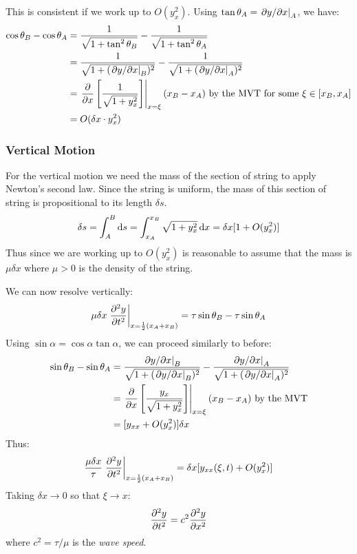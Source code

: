 \documentclass[../main.tex]{subfiles}
\begin{document}
This is consistent if we work up to $O(y^2_x)$.
Using $\tan \theta_A = \left. \partial y/\partial x \right|_{A}$, we have:
\begin{align*}
  \cos \theta_B - \cos \theta_A &= \frac{1}{\sqrt{1 + \tan^2 \theta_B}} - \frac{1}{\sqrt{1 + \tan^2 \theta_A}} \\
                                &= \frac{1}{\sqrt{1 + (\at{\partial y/\partial x}{B})^2}} - \frac{1}{\sqrt{1 + (\at{\partial y/\partial x}{A})^2}} \\
                                &= \at{\pderiv{}{x}\left[\frac{1}{\sqrt{1 + y^2_x}}\right]}{x = \xi} (x_B - x_A) \text{ by the MVT for some $\xi \in [x_B, x_A]$} \\
                                &= O(\delta x \cdot y^2_x)
\end{align*}

\subsubsection{Vertical Motion} \label{vertMot}
For the vertical motion we need the mass of the section of string to apply Newton's second law.
Since the string is uniform, the mass of this section of string is propositional to its length $\delta s$.
\begin{align*}
  \delta s = \int_{A}^{B} \d{s} = \int_{x_A}^{x_B} \sqrt{1 + y^2_x} \d{x} = \delta x[1 + O(y^2_x)]
\end{align*}
Thus since we are working up to $O(y^2_x)$ is reasonable to assume that the mass is $\mu \delta x$ where $\mu > 0$ is the density of the string.

We can now resolve vertically:
\[
  \mu \delta x \at{\pderiv[2]{y}{t}}{x = \frac{1}{2}(x_A + x_B)} = \tau \sin \theta_B - \tau \sin \theta_A
\]
Using $\sin \alpha = \cos \alpha \tan \alpha$, we can proceed similarly to before:
\begin{align*}
  \sin \theta_B - \sin \theta_A &= \frac{\at{\partial y/\partial x}{B}}{\sqrt{1 + (\at{\partial y/\partial x}{B})^2}} - \frac{\at{\partial y/\partial x}{A}}{\sqrt{1 + (\at{\partial y/\partial x}{A})^2}} \\
                                &= \at{\pderiv{}{x}\left[\frac{y_x}{\sqrt{1 + y^2_x}}\right]}{x = \xi} (x_B - x_A) \text{ by the MVT} \\
                                &= [y_{x x} + O(y^2_x)] \delta x
\end{align*}
Thus:
\[
  \frac{\mu \delta x}{\tau} \at{\pderiv[2]{y}{t}}{x = \frac{1}{2}(x_A + x_B)} = \delta x [y_{x x}(\xi, t) + O(y^2_x)]
\]
Taking $\delta x \to 0$ so that $\xi \to x$:
\[
  \pderiv[2]{y}{t} = c^2 \pderiv[2]{y}{x}
\]
where $c^2 = \tau / \mu$ is the \textit{wave speed}.
\end{document}
